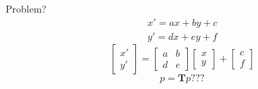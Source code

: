 \documentclass[9pt]{beamer}
\begin{document}
\begin{frame}{Problem?}
	\begin{eqnarray}\nonumber
	x' = ax+by + c \\
	y' = dx+ey + f\nonumber
	\end{eqnarray}
	\begin{equation}
	\left[ \begin{array}{c} x' \\ y'  \end{array} \right] = 
	\left[ \begin{array}{cc}
	a & b  \\
	d & e  \end{array} \right] 	\left[ \begin{array}{c} x \\ y  \end{array} \right] + 
	\left[ \begin{array}{c} c \\ f  \end{array} \right]\nonumber
	\end{equation}
	\begin{equation}
	p = \mathbf{T} p \mathbf{???}\nonumber
	\end{equation}
\end{frame}
\end{document}
